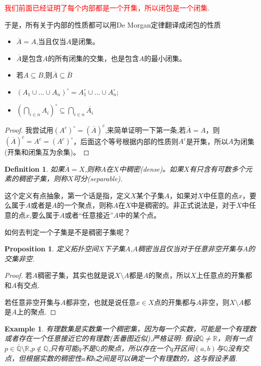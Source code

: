 \documentclass{article}
\newtheorem{proposition}[theorem]{Proposition}
\newtheorem{example}[theorem]{Example}
\newtheorem{definition}[theorem]{Definition}
\begin{document}
\textcolor{red}{我们前面已经证明了每个内部都是一个开集，所以闭包是一个闭集}.

于是，所有关于内部的性质都可以用De Morgan定律翻译成闭包的性质

\begin{itemize}
	\item $\overline{A} = A$,当且仅当$A$是闭集。
	\item $\overline{A}$是包含$A$的所有闭集的交集，也是包含$A$的最小闭集。
	\item 若$A \subseteq B$,则$\overline{A} \subseteq \overline{B}$
	\item $(A_1 \cup \ldots \cup A_n)^{\circ}=A_1^{\circ} \cup \ldots \cup A_n^{\circ}$;
	\item ${\left(\bigcap\limits_{i \in n} A_i\right)}^{\circ} \subseteq \bigcap\limits_{i \in n} \overline{A_i}$
\end{itemize}

\begin{proof}
我尝试用$(A^{c})^{\circ}=(\overline{A})^c$,来简单证明一下第一条,若$\overline{A}=A$，则$(\overline{A})^c = A^c=(A^{c})^{\circ}$，后面这个等号根据内部的性质则$A^c$是开集，所以$A$为闭集(开集和闭集互为余集)。
\end{proof}


\begin{definition}
如果$\overline{A}=X$,则称$A$在$X$中稠密(dense)。如果$X$有只含有可数多个元素的稠密子集，则称$X$可分(separable).
\end{definition}

这个定义有点抽象，第一个话是指，定义$X$某个子集$A$，如果对$X$中任意的点$x$，要么属于$A$或者是$A$的一个聚点，则称$A$在$X$中是稠密的。非正式说法是，对于$X$中任意的点$x$,要么属于$A$或者“任意接近”$A$中的某个点。

如何去判定一个子集是不是稠密子集呢？
\begin{proposition}
定义拓扑空间$X$下子集$A$,$A$稠密当且仅当对于任意非空开集与$A$的交集非空.
\end{proposition}

\begin{proof}
若$A$稠密子集，其实也就是说$X \setminus A$都是$A$的聚点，所以$X$上任意点的开集都和$A$有交点.

若任意非空开集与$A$都非空，也就是说任意$x \in X$点的开集都与$A$非空，则$X \setminus A$都是$A$上的聚点.
\end{proof}

\begin{example}
有理数集是实数集一个稠密集，因为每一个实数，可能是一个有理数或者存在一个任意接近它的有理数(丢番图近似),严格证明: 假设$\overline{\mathbb{Q}} \neq \mathbb{R}$，则有一点$p \in \overline{\mathbb{Q}} \setminus \mathbb{R}$,$p \notin \mathbb{Q}$,只有可能$q$不是$\mathbb{Q}$的聚点，所以存在一个$q$开区间$(a,b)$与$\mathbb{Q}$没有交点，但根据实数的稠密性$a$和$b$之间是可以确定一个有理数的，这与假设矛盾.
\end{example}
\end{document}
